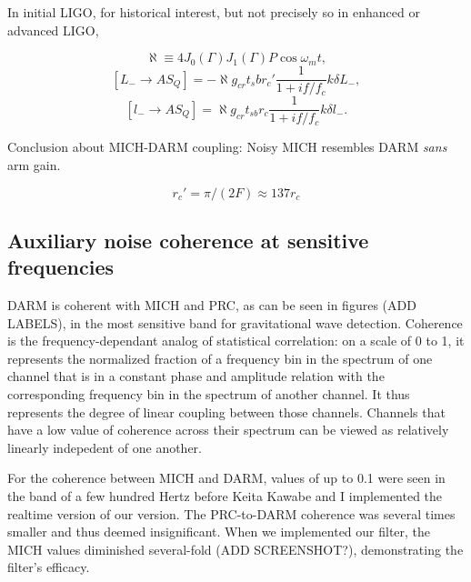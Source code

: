         In initial LIGO, for historical interest, but not precisely so in enhanced or advanced LIGO,

        $$
        \aleph \equiv 4 J_0 (\Gamma) J_1 (\Gamma) P \cos \omega_m t,
        $$
        $$
        [L_{-} \rightarrow \textit{AS}_Q] = -\aleph g_{cr}t_sb r_c ' \frac{1}{1 + if/f_c} k \delta L_{-},
        $$
        $$
        [l_{-} \rightarrow \textit{AS}_Q] = \aleph g_{cr} t_{sb} r_c \frac{1}{1+if/f_c} k \delta l_{-}.
        $$


        Conclusion about MICH-DARM coupling: Noisy MICH resembles DARM \textit{sans} arm gain.

        $$
        r_{c}' = \pi / (2F) \approx 137 r_c
        $$

        

        \subsection{Auxiliary noise coherence at sensitive frequencies}
        \label{aux_noise}

	    DARM is coherent with MICH and PRC, as can be seen in figures (ADD LABELS), in the most sensitive band for gravitational wave detection. Coherence is the frequency-dependant analog of statistical correlation: on a scale of 0 to 1, it represents the normalized fraction of a frequency bin in the spectrum of one channel that is in a constant phase and amplitude relation with the corresponding frequency bin in the spectrum of another channel. It thus represents the degree of linear coupling between those channels. Channels that have a low value of coherence across their spectrum can be viewed as relatively linearly indepedent of one another. 

        For the coherence between MICH and DARM, values of up to 0.1 were seen in the band of a few hundred Hertz before Keita Kawabe and I implemented the realtime version of our version. The PRC-to-DARM coherence was several times smaller and thus deemed insignificant. When we implemented our filter, the MICH values diminished several-fold (ADD SCREENSHOT?), demonstrating the filter's efficacy.

